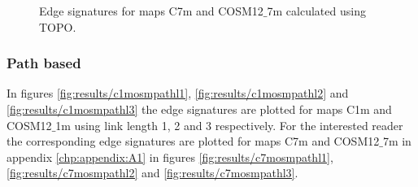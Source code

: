 \enlargethispage{5\baselineskip}

\begin{figure}[H]%

 
  
 \caption{Edge signatures for maps C7m and COSM12$\_$7m calculated using TOPO.}%
 \label{fig:results/sig_topo_7m}
\end{figure}



\subsubsection{Path based}


In figures \ref{fig:results/c1mosmpathl1}, \ref{fig:results/c1mosmpathl2} and \ref{fig:results/c1mosmpathl3} the edge signatures are plotted for maps C1m and COSM12$\_$1m using link length 1, 2 and 3 respectively. For the interested reader the corresponding edge signatures are plotted for maps C7m and COSM12$\_$7m in appendix \ref{chp:appendix:A1} in figures \ref{fig:results/c7mosmpathl1}, \ref{fig:results/c7mosmpathl2} and \ref{fig:results/c7mosmpathl3}. 

